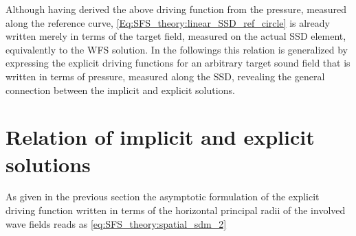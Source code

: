 Although having derived the above driving function from the pressure, measured along the reference curve, \eqref{Eq:SFS_theory:linear_SSD_ref_circle} is already written merely in terms of the target field, measured on the actual SSD element, equivalently to the WFS solution.
In the followings this relation is generalized by expressing the explicit driving functions for an arbitrary target sound field that is written in terms of pressure, measured along the SSD, revealing the general connection between the implicit and explicit solutions.

\section{Relation of implicit and explicit solutions}

As given in the previous section the asymptotic formulation of the explicit driving function written in terms of the horizontal principal radii of the involved wave fields reads as \eqref{eq:SFS_theory:spatial_sdm_2}

